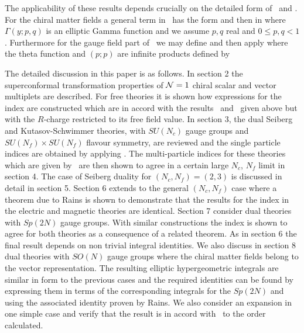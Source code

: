 The applicability of these results depends crucially on the detailed form of
\ione\ and \itwo. For the chiral matter fields a general term in \ione\ has the form
\eqn{}
and then in \itwo
\eqn{}
where $\Gamma(y;p,q)$ is an elliptic Gamma function and we  assume $p,q$ real
and $0\le p,q<1$.
Furthermore for the gauge field part of \ione\ we may define
\eqn{}
and then apply
\eqn{}
where the theta  function and $(p;p)$ are infinite products  defined by
\eqn{}
 

The detailed discussion in this paper is as follows.  In section 2 the
superconformal transformation properties of ${\cal N}=1$ chiral scalar and 
vector multiplets are described. For free theories it is shown how
expressions for the index are constructed which are in accord with
the results \ione\ and \itwo\ given above but with the $R$-charge restricted
to its free field value.
In section 3, the dual Seiberg and Kutasov-Schwimmer theories, with $SU(N_c)$
gauge groups and $SU(N_f) \times SU(N_f)$ flavour symmetry, are reviewed and 
the single particle indices are obtained by applying \ione.
The multi-particle indices for these theories which are given by \itwo\ are then 
shown to agree in a certain large $N_c$, $N_f$ limit in section 4.  The case
of Seiberg duality for $(N_c,N_f)=(2,3)$ is discussed in detail
in section 5.  Section 6 extends to the general $(N_c,N_f)$ case where a theorem due to
Rains is shown to demonstrate that the results for the index in the electric
and magnetic theories are identical. 
Section 7 consider dual theories with $Sp(2N)$ gauge groups. With similar constructions
the index is shown to agree for both theories as a consequence of a related theorem.
As in section 6 the final result depends on non trivial integral identities. We also
discuss in section 8 dual theories with $SO(N)$ gauge groups where the chiral matter fields
belong to the vector representation. The resulting elliptic hypergeometric integrals are 
similar in form to the previous cases and the required identities can be found by expressing
them in terms of the corresponding integrals for the $Sp(2N)$ and using the
associated identity proven by Rains.
We also consider an expansion in one simple case and verify that the result is in
accord with \expI\ to the order calculated. 

